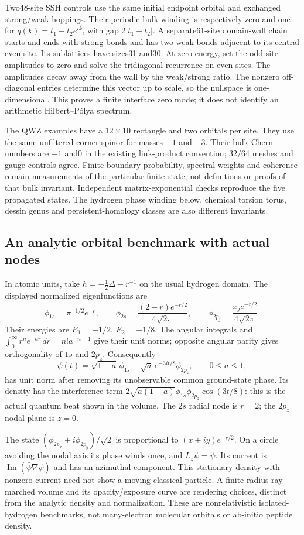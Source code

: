 \documentclass[11pt,oneside,openany]{book}
\theoremstyle{definition}\newtheorem{definition}[theorem]{Definition}
\theoremstyle{remark}\newtheorem{remark}[theorem]{Remark}
\begin{document}
Two48-site SSH controls use the same initial endpoint orbital and exchanged
strong/weak hoppings. Their periodic bulk winding is respectively zero and
one for $q(k)=t_1+t_2e^{ik}$, with gap $2|t_1-t_2|$. A separate61-site domain-wall chain starts and ends
with strong bonds and has two weak bonds adjacent to its central even site.
Its sublattices have sizes31 and30. At zero energy, set the odd-site amplitudes
to zero and solve the tridiagonal recurrence on even sites. The amplitudes
decay away from the wall by the weak/strong ratio. The nonzero off-diagonal
entries determine this vector up to scale, so the nullspace is one-dimensional.
This proves a finite interface zero mode; it does not identify an arithmetic
Hilbert--P\'olya spectrum.

The QWZ examples have a $12\times10$ rectangle and two orbitals per site.
They use the same unfiltered corner spinor for masses $-1$ and $-3$.
Their bulk Chern numbers are $-1$ and0 in the existing link-product convention;
32/64 meshes and gauge controls agree. Finite boundary probability, spectral
weights and coherence remain measurements of the particular finite state,
not definitions or proofs of that bulk invariant. Independent matrix-exponential
checks reproduce the five propagated states. The hydrogen phase winding below,
chemical torsion torus, dessin genus and persistent-homology classes are also
different invariants.

\subsection{An analytic orbital benchmark with actual nodes}
In atomic units, take $h=-\frac12\Delta-r^{-1}$ on the usual hydrogen domain.
The displayed normalized eigenfunctions are
\[
 \phi_{1s}=\pi^{-1/2}e^{-r},\qquad
 \phi_{2s}=\frac{(2-r)e^{-r/2}}{4\sqrt{2\pi}},\qquad
 \phi_{2p_j}=\frac{x_j e^{-r/2}}{4\sqrt{2\pi}}.
\]
Their energies are $E_1=-1/2$, $E_2=-1/8$. The angular integrals and
$\int_0^\infty r^n e^{-ar}\,dr=n!a^{-n-1}$ give their unit norms;
opposite angular parity gives orthogonality of $1s$ and $2p_z$.
Consequently
\[
 \psi(t)=\sqrt{1-a}\,\phi_{1s}
       +\sqrt a\,e^{-3it/8}\phi_{2p_z},\qquad 0\le a\le1,
\]
has unit norm after removing its unobservable common ground-state phase.
Its density has the interference term
$2\sqrt{a(1-a)}\phi_{1s}\phi_{2p_z}\cos(3t/8)$: this is the actual quantum
beat shown in the volume. The $2s$ radial node is $r=2$; the $2p_z$ nodal
plane is $z=0$.

The state $(\phi_{2p_x}+i\phi_{2p_y})/\sqrt2$ is proportional to
$(x+iy)e^{-r/2}$. On a circle avoiding the nodal axis its phase winds once,
and $L_z\psi=\psi$. Its current is
$\operatorname{Im}(\bar\psi\nabla\psi)$ and has an azimuthal component.
This stationary density with nonzero current need not show a moving classical
particle. A finite-radius ray-marched volume and its opacity/exposure curve
are rendering choices, distinct from the analytic density and normalization.
These are nonrelativistic isolated-hydrogen benchmarks, not many-electron
molecular orbitals or ab-initio peptide density.
\end{document}
